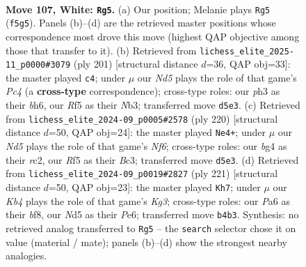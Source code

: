 \documentclass[11pt]{article}
\begin{document}
\clearpage

\begin{figure}[p]\centering
\begin{subfigure}{0.46\textwidth}\centering
\resizebox{\linewidth}{!}{%
\newchessgame
\chessboard[
  setfen={8/2B5/PPk5/3N1R2/1K4b1/7p/8/8 w - - 1 107},
  showmover=false,
  pgfstyle=straightmove, color=movearrow, markmove={f5-g5}
]}
\caption{}
\end{subfigure}\hfill
\begin{subfigure}{0.46\textwidth}\centering
\resizebox{\linewidth}{!}{%
\newchessgame
\chessboard[
  setfen={8/8/pK5B/Pbp5/8/1n6/1R6/3k4 b - - 80 101},
  showmover=false,
  pgfstyle=straightmove, color=movearrow, markmove={c5-c4}
]}
\caption{}
\end{subfigure}
\\[4pt]
\begin{subfigure}{0.46\textwidth}\centering
\resizebox{\linewidth}{!}{%
\newchessgame
\chessboard[
  setfen={r7/3B2k1/4PN2/6K1/8/2B5/2r5/8 w - - 19 111},
  showmover=false,
  pgfstyle=straightmove, color=movearrow, markmove={f6-e4}
]}
\caption{}
\end{subfigure}\hfill
\begin{subfigure}{0.46\textwidth}\centering
\resizebox{\linewidth}{!}{%
\newchessgame
\chessboard[
  setfen={5B2/8/2pKp1kP/3b4/3P4/8/8/8 b - - 0 111},
  showmover=false,
  pgfstyle=straightmove, color=movearrow, markmove={g6-h7}
]}
\caption{}
\end{subfigure}
\caption{\textbf{Move 107, White: \texttt{Rg5}.} (a) Our position; Melanie plays \texttt{Rg5} (\texttt{f5g5}). Panels (b)--(d) are the retrieved master positions whose correspondence most drove this move (highest QAP objective among those that transfer to it). (b) Retrieved from \texttt{lichess\_elite\_2025-11\_p0000\#3079} (ply 201) [structural distance $d$=36, QAP obj=33]: the master played \texttt{c4}; under $\mu$ our \emph{Nd5} plays the role of that game's \emph{Pc4} (a \textbf{cross-type} correspondence); cross-type roles: our \emph{p}h3 as their \emph{b}h6, our \emph{R}f5 as their \emph{N}b3; transferred move \texttt{d5e3}. (c) Retrieved from \texttt{lichess\_elite\_2024-09\_p0005\#2578} (ply 220) [structural distance $d$=50, QAP obj=24]: the master played \texttt{Ne4+}; under $\mu$ our \emph{Nd5} plays the role of that game's \emph{Nf6}; cross-type roles: our \emph{b}g4 as their \emph{r}c2, our \emph{R}f5 as their \emph{B}c3; transferred move \texttt{d5e3}. (d) Retrieved from \texttt{lichess\_elite\_2024-09\_p0019\#2827} (ply 221) [structural distance $d$=50, QAP obj=23]: the master played \texttt{Kh7}; under $\mu$ our \emph{Kb4} plays the role of that game's \emph{Kg3}; cross-type roles: our \emph{P}a6 as their \emph{b}f8, our \emph{N}d5 as their \emph{P}e6; transferred move \texttt{b4b3}. Synthesis: no retrieved analog transferred to \texttt{Rg5} -- the \texttt{search} selector chose it on value (material / mate); panels (b)--(d) show the strongest nearby analogies.}
\label{fig:thought-m212}
\end{figure}
\end{document}
